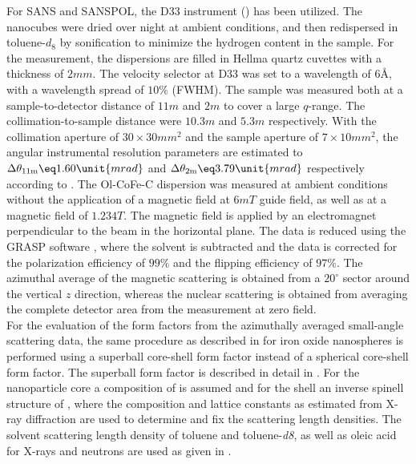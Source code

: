 \documentclass[\main/dresen_thesis.tex]{subfiles}
\begin{document}
    For SANS and SANSPOL, the D33 instrument () has been utilized.
    The nanocubes were dried over night at ambient conditions, and then redispersed in toluene-$\mathit{d_8}$ by sonification to minimize the hydrogen content in the sample.
    For the measurement, the dispersions are filled in Hellma quartz cuvettes with a thickness of $2 \unit{mm}$.
    The velocity selector at D33 was set to a wavelength of $6 \unit{\angstrom}$, with a wavelength spread of $10 \%$ (FWHM).
    The sample was measured both at a sample-to-detector distance of $11 \unit{m}$ and $2 \unit{m}$ to cover a large $q$-range.
    The collimation-to-sample distance were $10.3 \unit{m}$ and $5.3 \unit{m}$ respectively.
    With the collimation aperture of $30 \times 30 \unit{mm^2}$ and the sample aperture of $7 \times 10 \unit{mm^2}$, the angular instrumental resolution parameters are estimated to $\Delta \theta_\mathrm{11 m} \eq 1.60 \unit{mrad}$ and $\Delta \theta_\mathrm{2 m} \eq 3.79 \unit{mrad}$ respectively according to .
    The Ol-CoFe-C dispersion was measured at ambient conditions without the application of a magnetic field at $6 \unit{mT}$ guide field, as well as at a magnetic field of $1.234 \unit{T}$. %
    The magnetic field is applied by an electromagnet perpendicular to the beam in the horizontal plane.
    The data is reduced using the GRASP software \cite{Dewhurst_2003_Grasp}, where the solvent is subtracted and the data is corrected for the polarization efficiency of $99 \%$ and the flipping efficiency of $97 \%$.
    The azimuthal average of the magnetic scattering is obtained from a $20 ^\circ$ sector around the vertical $z$ direction, whereas the nuclear scattering is obtained from averaging the complete detector area from the measurement at zero field.
    \\

    For the evaluation of the form factors from the azimuthally averaged small-angle scattering data, the same procedure as described in  for iron oxide nanospheres is performed using a superball core-shell form factor instead of a spherical core-shell form factor.
    The superball form factor is described in detail in .
    For the nanoparticle core a composition of  is assumed and for the shell an inverse spinell structure of , where the composition and lattice constants as estimated from X-ray diffraction are used to determine and fix the scattering length densities.
    The solvent scattering length density of toluene and toluene-\textit{d8}, as well as oleic acid for X-rays and neutrons are used as given in .
\end{document}
